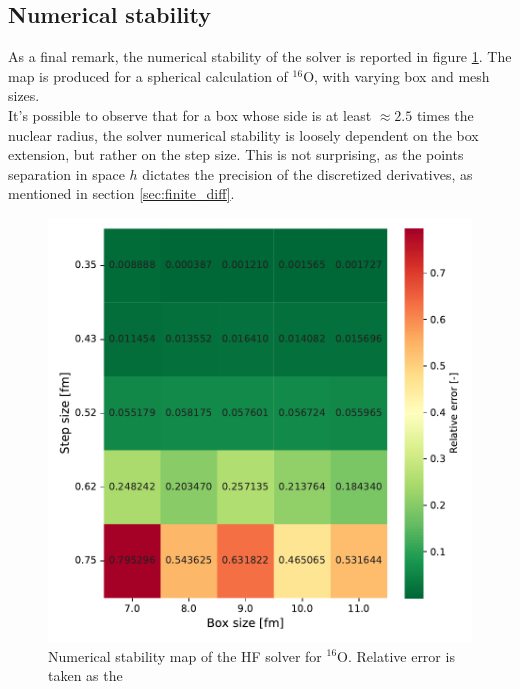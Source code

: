 \subsection{Numerical stability}
As a final remark, the numerical stability of the solver is reported in figure \ref{fig:stability}. The map is produced for a spherical calculation of $^{16}$O, with varying box and mesh sizes. 
\\It's possible to observe that for a box whose side is at least $\approx 2.5$ times the nuclear radius, the solver numerical stability is loosely dependent on the box extension, but rather on the step size. This is not surprising, as the points separation in space $h$ dictates the precision of the discretized derivatives, as mentioned in section \ref{sec:finite_diff}.
\begin{figure}[H]
    \centering
    \includegraphics[width=1.0\textwidth]{Images/stability.pdf}
    \caption{Numerical stability map of the HF solver for $^{16}$O. Relative error is taken as the }
    \label{fig:stability}
\end{figure}